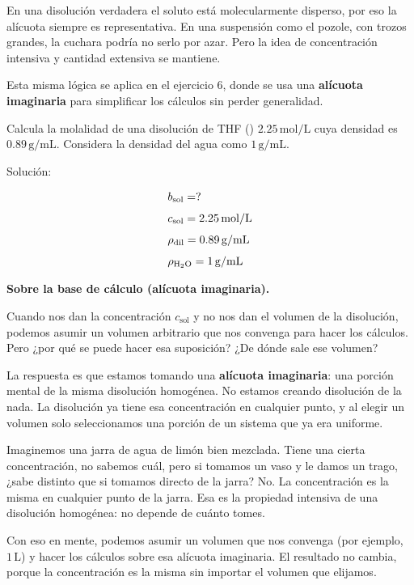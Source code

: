 \begin{notadidactica}
En una disolución verdadera el soluto está molecularmente disperso, por eso la 
alícuota siempre es representativa. En una suspensión como el pozole, con trozos 
grandes, la cuchara podría no serlo por azar. Pero la idea de concentración 
intensiva y cantidad extensiva se mantiene.

Esta misma lógica se aplica en el ejercicio 6, donde se usa una \textbf{alícuota 
imaginaria} para simplificar los cálculos sin perder generalidad.
\end{notadidactica}

\begin{exercise}{}{}
Calcula la molalidad de una disolución de THF () 
$2.25\,\mathrm{mol/L}$ cuya densidad es $0.89\,\mathrm{g/mL}$. Considera la 
densidad del agua como $1\,\mathrm{g/mL}$.

Solución:

\begin{align*}
    &b_{\mathrm{sol}} = ? \\[4pt]
    &c_{\mathrm{sol}} = 2.25\,\mathrm{mol/L} \\[4pt]
    &\rho_{\mathrm{dil}} = 0.89\,\mathrm{g/mL} \\[4pt]
    &\rho_{\ce{H2O}} = 1\,\mathrm{g/mL}
\end{align*}

\begin{notaimportante}
\textbf{Sobre la base de cálculo (alícuota imaginaria).}

Cuando nos dan la concentración $c_{\mathrm{sol}}$ y no nos dan el volumen de 
la disolución, podemos asumir un volumen arbitrario que nos convenga para 
hacer los cálculos. Pero ¿por qué se puede hacer esa suposición? ¿De dónde 
sale ese volumen?

La respuesta es que estamos tomando una \textbf{alícuota imaginaria}: una 
porción mental de la misma disolución homogénea. No estamos creando disolución 
de la nada. La disolución ya tiene esa concentración en cualquier punto, y al 
elegir un volumen solo seleccionamos una porción de un sistema que ya era 
uniforme.

Imaginemos una jarra de agua de limón bien mezclada. Tiene una cierta 
concentración, no sabemos cuál, pero si tomamos un vaso y le damos un trago, 
¿sabe distinto que si tomamos directo de la jarra? No. La concentración es la 
misma en cualquier punto de la jarra. Esa es la propiedad intensiva de una 
disolución homogénea: no depende de cuánto tomes.

\medskip
Con eso en mente, podemos asumir un volumen que nos convenga (por ejemplo, 
$1\,\mathrm{L}$) y hacer los cálculos sobre esa alícuota imaginaria. El 
resultado no cambia, porque la concentración es la misma sin importar el 
volumen que elijamos.


\end{notaimportante}
\end{exercise}
